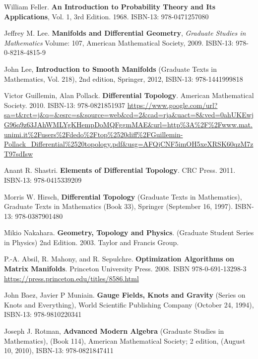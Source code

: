 \documentclass[10pt]{amsart}
\begin{document}
\begin{thebibliography}{9}

William Feller.  \textbf{An Introduction to Probability Theory and Its Applications}, Vol. 1, 3rd Edition.  1968.  ISBN-13: 978-0471257080



Jeffrey M. Lee. \textbf{Manifolds and Differential Geometry}, \emph{Graduate Studies in Mathematics} Volume: 107, American Mathematical Society, 2009. ISBN-13: 978-0-8218-4815-9

John Lee, \textbf{Introduction to Smooth Manifolds} (Graduate Texts in Mathematics, Vol. 218), 2nd edition, Springer,  2012, ISBN-13: 978-1441999818

Victor Guillemin, Alan Pollack. \textbf{Differential Topology}. American Mathematical Society. 2010. ISBN-13: 978-0821851937
\url{https://www.google.com/url?sa=t&rct=j&q=&esrc=s&source=web&cd=2&cad=rja&uact=8&ved=0ahUKEwjG96q9z63JAhWMLYgKHempDoMQFggmMAE&url=http\%3A\%2F\%2Fwww.mat.unimi.it\%2Fusers\%2Fdedo\%2Ftop\%2520diff\%2FGuillemin-Pollack_Differential\%2520topology.pdf&usg=AFQjCNF5imOH5xeXRSK60qzM7zT97sdIsw}

Anant R. Shastri. \textbf{Elements of Differential Topology}. CRC Press. 2011. ISBN-13: 978-0415339209

Morris W. Hirsch, \textbf{Differential Topology} (Graduate Texts in Mathematics), Graduate Texts in Mathematics (Book 33), Springer (September 16, 1997). ISBN-13: 978-0387901480

Mikio Nakahara. \textbf{Geometry, Topology and Physics}. (Graduate Student Series in Physics) 2nd Edition. 2003. Taylor and Francis Group.

P.-A. Absil, R. Mahony, and R. Sepulchre.  \textbf{Optimization Algorithms on Matrix Manifolds}.  Princeton University Press.  2008.  ISBN 978-0-691-13298-3
\url{https://press.princeton.edu/titles/8586.html}  

John Baez, Javier P Muniain.  \textbf{Gauge Fields, Knots and Gravity} (Series on Knots and Everything), World Scientific Publishing Company (October 24, 1994), ISBN-13: 978-9810220341

Joseph J. Rotman, \textbf{Advanced Modern Algebra} (Graduate Studies in Mathematics), (Book 114), American Mathematical Society; 2 edition, (August 10, 2010), ISBN-13: 978-0821847411


\end{thebibliography}
\end{document}

